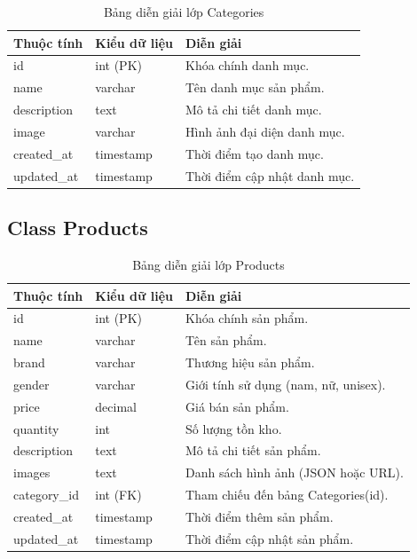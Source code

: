 \begin{table}[H]
\centering
\caption{Bảng diễn giải lớp Categories}
\label{tab:categories}
\begin{tabular}{|l|l|p{7cm}|}
\hline
\textbf{Thuộc tính} & \textbf{Kiểu dữ liệu} & \textbf{Diễn giải} \\ \hline
id & int (PK) & Khóa chính danh mục. \\ \hline
name & varchar & Tên danh mục sản phẩm. \\ \hline
description & text & Mô tả chi tiết danh mục. \\ \hline
image & varchar & Hình ảnh đại diện danh mục. \\ \hline
created\_at & timestamp & Thời điểm tạo danh mục. \\ \hline
updated\_at & timestamp & Thời điểm cập nhật danh mục. \\ \hline
\end{tabular}
\end{table}

\subsection{Class Products}

\begin{table}[H]
\centering
\caption{Bảng diễn giải lớp Products}
\label{tab:products}
\begin{tabular}{|l|l|p{7cm}|}
\hline
\textbf{Thuộc tính} & \textbf{Kiểu dữ liệu} & \textbf{Diễn giải} \\ \hline
id & int (PK) & Khóa chính sản phẩm. \\ \hline
name & varchar & Tên sản phẩm. \\ \hline
brand & varchar & Thương hiệu sản phẩm. \\ \hline
gender & varchar & Giới tính sử dụng (nam, nữ, unisex). \\ \hline
price & decimal & Giá bán sản phẩm. \\ \hline
quantity & int & Số lượng tồn kho. \\ \hline
description & text & Mô tả chi tiết sản phẩm. \\ \hline
images & text & Danh sách hình ảnh (JSON hoặc URL). \\ \hline
category\_id & int (FK) & Tham chiếu đến bảng Categories(id). \\ \hline
created\_at & timestamp & Thời điểm thêm sản phẩm. \\ \hline
updated\_at & timestamp & Thời điểm cập nhật sản phẩm. \\ \hline
\end{tabular}
\end{table}

